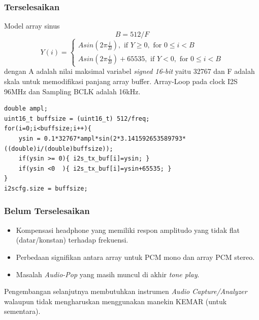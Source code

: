 \documentclass[table,dvipsnames,10pt]{beamer}
\begin{document}
	\begin{frame}[fragile]
	\frametitle{Terselesaikan}
	\begin{exampleblock}{Model array sinus}
		\[ B = 512/F \]
		\[
		Y(i) =
		\begin{cases}
		A sin(2 \pi \frac{i}{B}), \text{ if } Y \geq 0, \text{ for } 0 \leq i < B\\
		A sin(2 \pi \frac{i}{B})+65535, \text{ if } Y < 0, \text{ for } 0 \leq i < B
		\end{cases}
		\]
		dengan A adalah nilai maksimal variabel \textit{signed 16-bit} yaitu 32767
		dan F adalah skala untuk memodifikasi panjang array buffer.
		Array-Loop pada clock I2S 96MHz dan Sampling BCLK adalah 16kHz.
	\end{exampleblock}
	\begin{exampleblock}{}
		\begin{verbatim}
double ampl;
uint16_t buffsize = (uint16_t) 512/freq;
for(i=0;i<buffsize;i++){
	ysin = 0.1*32767*ampl*sin(2*3.141592653589793*((double)i/(double)buffsize));
	if(ysin >= 0){ i2s_tx_buf[i]=ysin; }
	if(ysin <0  ){ i2s_tx_buf[i]=ysin+65535; }
}
i2scfg.size = buffsize;
		\end{verbatim}
	\end{exampleblock}
	\end{frame}

	\begin{frame}[fragile]
	\frametitle{Belum Terselesaikan}
	\begin{exampleblock}{}
		\begin{itemize}
			\item Kompensasi headphone yang memiliki respon amplitudo yang
			tidak flat (datar/konstan) terhadap frekuensi.
			
			\item Perbedaan signifikan antara array untuk PCM mono dan array PCM stereo.
			
			\item Masalah \textit{Audio-Pop} yang masih muncul di akhir \textit{tone play}.
		\end{itemize}
	\end{exampleblock}
	\begin{exampleblock}{}
		Pengembangan selanjutnya membutuhkan instrumen \textit{Audio Capture/Analyzer}
		walaupun tidak mengharuskan menggunakan manekin KEMAR (untuk sementara).
	\end{exampleblock}
	\end{frame}
	
\end{document}
